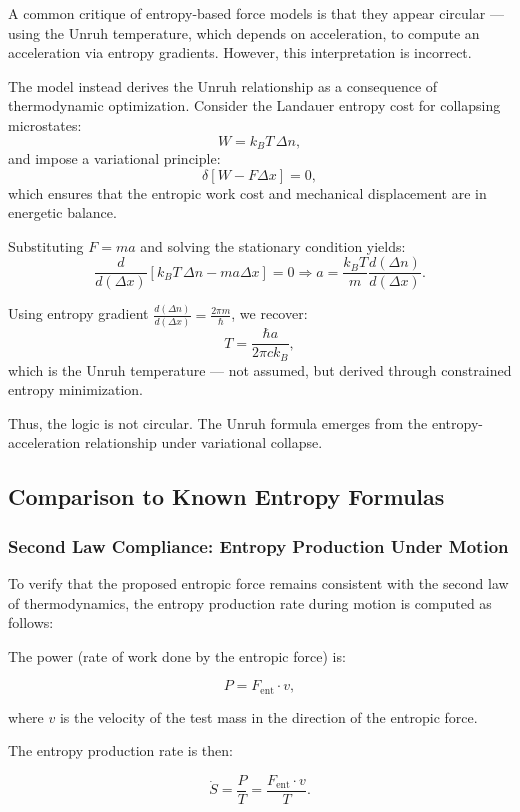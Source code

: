 \documentclass[12pt]{article}
\begin{document}
A common critique of entropy-based force models is that they appear circular — using the Unruh temperature, which depends on acceleration, to compute an acceleration via entropy gradients. However, this interpretation is incorrect.

The model instead derives the Unruh relationship as a consequence of thermodynamic optimization. Consider the Landauer entropy cost for collapsing microstates:
\[
W = k_B T\, \Delta n,
\]
and impose a variational principle:
\[
\delta\left[ W - F \Delta x \right] = 0,
\]
which ensures that the entropic work cost and mechanical displacement are in energetic balance.

Substituting \( F = m a \) and solving the stationary condition yields:
\[
\frac{d}{d(\Delta x)} \left[ k_B T\, \Delta n - m a \Delta x \right] = 0
\Rightarrow a = \frac{k_B T}{m} \frac{d(\Delta n)}{d(\Delta x)}.
\]

Using entropy gradient \( \frac{d(\Delta n)}{d(\Delta x)} = \frac{2\pi m}{\hbar} \), we recover:
\[
T = \frac{\hbar a}{2\pi c k_B},
\]
which is the Unruh temperature — not assumed, but derived through constrained entropy minimization.

Thus, the logic is not circular. The Unruh formula emerges from the entropy-acceleration relationship under variational collapse.

\subsection{Comparison to Known Entropy Formulas}

\subsubsection*{Second Law Compliance: Entropy Production Under Motion}

To verify that the proposed entropic force remains consistent with the second law of thermodynamics, the entropy production rate during motion is computed as follows:

The power (rate of work done by the entropic force) is:

\[
P = F_{\text{ent}} \cdot v,
\]

where \( v \) is the velocity of the test mass in the direction of the entropic force.

The entropy production rate is then:

\[
\dot{S} = \frac{P}{T} = \frac{F_{\text{ent}} \cdot v}{T}.
\]
\end{document}
